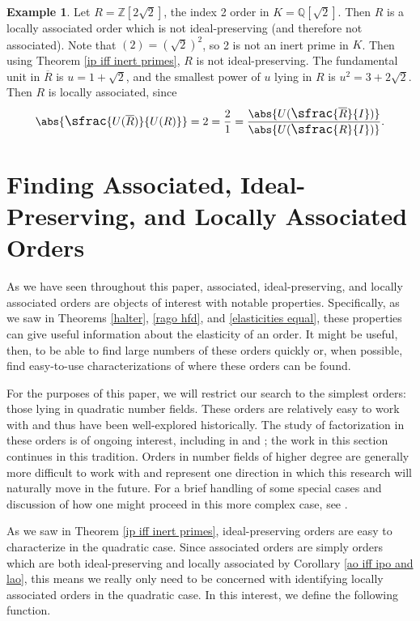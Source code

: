 \documentclass[12pt]{amsart}
\theoremstyle{definition}
\newtheorem{example}[theorem]{Example}
\newcommand{\bZ}{\mathbb Z}
\newcommand{\bQ}{\mathbb Q}
\newcommand{\Rbar}{\overline{R}}
\newcommand{\quot}[2]{\large\sfrac{#1}{#2}\normalsize}
\begin{document}
	\begin{example}
		\label{la not ip}
		Let $R=\bZ[2\sqrt{2}]$, the index 2 order in $K=\bQ[\sqrt{2}]$. Then $R$ is a locally associated order which is not ideal-preserving (and therefore not associated). Note that $(2)=(\sqrt{2})^2$, so 2 is not an inert prime in $K$. Then using Theorem \ref{ip iff inert primes}, $R$ is not ideal-preserving. The fundamental unit in $\Rbar$ is $u=1+\sqrt{2}$, and the smallest power of $u$ lying in $R$ is $u^2=3+2\sqrt{2}$. Then $R$ is locally associated, since
		$$\abs{\quot{U(\Rbar)}{U(R)}}=2=\frac{2}{1}=\frac{\abs{U(\quot{\Rbar}{I})}}{\abs{U(\quot{R}{I})}}.$$
	\end{example}
	
	\section{Finding Associated, Ideal-Preserving, and Locally Associated Orders}
	As we have seen throughout this paper, associated, ideal-preserving, and locally associated orders are objects of interest with notable properties. Specifically, as we saw in Theorems \ref{halter}, \ref{rago hfd}, and \ref{elasticities equal}, these properties can give useful information about the elasticity of an order. It might be useful, then, to be able to find large numbers of these orders quickly or, when possible, find easy-to-use characterizations of where these orders can be found.
	
	For the purposes of this paper, we will restrict our search to the simplest orders: those lying in quadratic number fields. These orders are relatively easy to work with and thus have been well-explored historically. The study of factorization in these orders is of ongoing interest, including in \cite{choi2024class} and \cite{pollack}; the work in this section continues in this tradition. Orders in number fields of higher degree are generally more difficult to work with and represent one direction in which this research will naturally move in the future. For a brief handling of some special cases and discussion of how one might proceed in this more complex case, see \cite{dissertation}.
	
	As we saw in Theorem \ref{ip iff inert primes}, ideal-preserving orders are easy to characterize in the quadratic case. Since associated orders are simply orders which are both ideal-preserving and locally associated by Corollary \ref{ao iff ipo and lao}, this means we really only need to be concerned with identifying locally associated orders in the quadratic case. In this interest, we define the following function.
	
\end{document}
